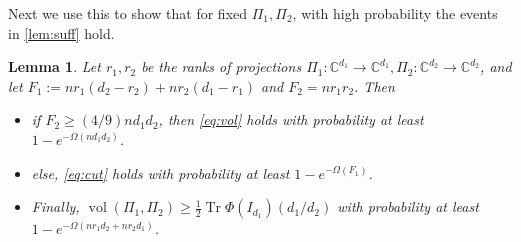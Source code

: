 \documentclass{article}
\newtheorem{lemma}[theorem]{Lemma}
\newcommand{\C}{{\mathbb{C}}}
\newcommand{\vol}{\operatorname{vol}}
\newcommand\tr{\operatorname{Tr}}
\begin{document}
Next we use this to show that for fixed $\Pi_1, \Pi_2$, with high probability the events in \cref{lem:suff} hold. 
\begin{lemma}\label{lem:probabilities}
Let $r_1, r_2$ be the ranks of projections $\Pi_1: \C^{d_1} \to \C^{d_1}, \Pi_2: \C^{d_2} \to \C^{d_2}$, and let $F_1:= n r_1(d_2 - r_2) + n r_2(d_1-r_1)$ and $F_2 = n r_1 r_2$. Then 
\begin{itemize}
\item if $F_2 \geq (4/9) n d_1 d_2$, then \cref{eq:vol} holds with probability at least $1 - e^{-\Omega( n d_1 d_2)}$. 
\item else, \cref{eq:cut} holds with probability at least $1 - e^{-\Omega( F_1)}$. 
\item Finally, $\vol(\Pi_1, \Pi_2) \geq \frac{1}{2}\tr \Phi(I_{d_1}) (d_1/d_2)$ with probability at least $1 - e^{- \Omega(n r_1 d_2 + n r_2 d_1)}$.
\end{itemize}
\end{lemma}
\end{document}
